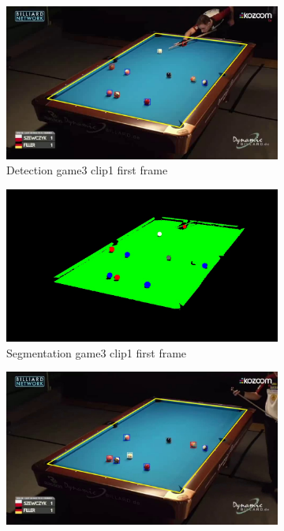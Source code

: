 \begin{figure}[H]
    \centering
    \begin{subfigure}[b]{0.35\textwidth}
        \centering
        \includegraphics[width=\textwidth]{images/Detection/game3_clip1_detected_balls_first_frame.jpg}
        \caption{Detection game3 clip1 first frame}
        \label{fig: game3_clip1_first_frame_detected}
    \end{subfigure}
    \begin{subfigure}[b]{0.35\textwidth}
        \centering
        \includegraphics[width=\textwidth]{images/Segmentation/game3_clip1_segmented_balls_first_frame.jpg}
        \caption{Segmentation game3 clip1 first frame}
		\label{fig: game3_clip1_first_frame_segmented}
    \end{subfigure}
    \begin{subfigure}[b]{0.35\textwidth}
        \centering
        \includegraphics[width=\textwidth]{images/Detection/game3_clip1_detected_balls_last_frame.jpg}

\end{subfigure}
\end{figure}
